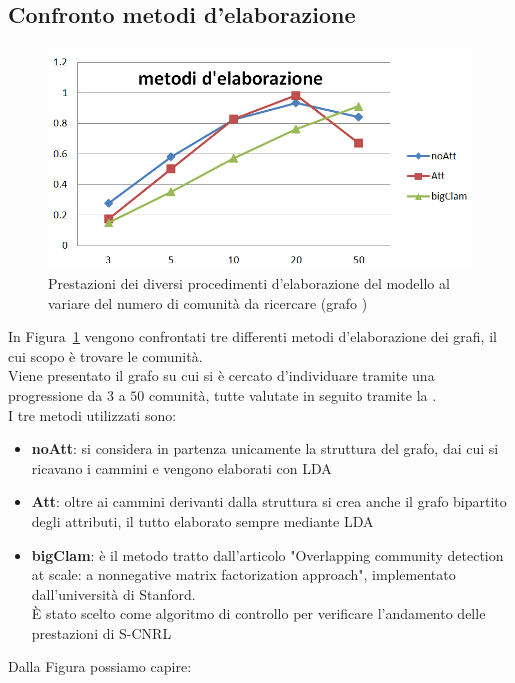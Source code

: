 \subsection{Confronto metodi d'elaborazione}%
%
\begin{figure}[htp]
	\centering
	\includegraphics[width=\linewidth]{immagini/MOD_3_elaborazione}
	\caption{Prestazioni dei diversi procedimenti d'elaborazione del modello al variare del numero di comunità da ricercare (grafo \cora)}
	\label{fig:MOD_3_elaborazione}
\end{figure}
%
In Figura~\ref{fig:MOD_3_elaborazione} vengono confrontati tre differenti metodi d'elaborazione dei grafi, il cui scopo è trovare le comunità.\\
Viene presentato il grafo \cora su cui si è cercato d'individuare tramite una progressione da $3$ a $50$ comunità, tutte valutate in seguito tramite la \mmod. \\
I tre metodi utilizzati sono:
\begin{itemize}
	\item \textbf{noAtt}: si considera in partenza unicamente la struttura del grafo, dai cui si ricavano i cammini e vengono elaborati con LDA
	\item \textbf{Att}: oltre ai cammini derivanti dalla struttura si crea anche il grafo bipartito degli attributi, il tutto elaborato sempre mediante LDA
	\item \textbf{bigClam}: è il metodo tratto dall'articolo "Overlapping community detection at scale: a nonnegative matrix factorization approach"\cite{bigClam_paper}, implementato dall'università di Stanford\cite{bigClam_code}.\\
	È stato scelto come algoritmo di controllo per verificare l'andamento delle prestazioni di S-CNRL
\end{itemize}
Dalla Figura possiamo capire:
